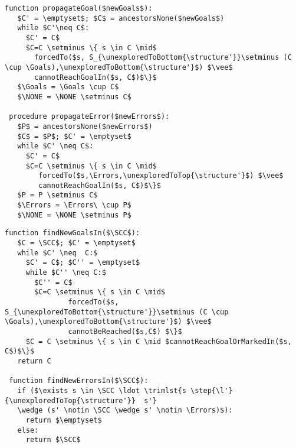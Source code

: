 \lstset{numbers=none, numberstyle=\tiny, stepnumber=1, numbersep=5pt}
\begin{lstlisting}[language={pseudocode},label={lst:dcs.propagate},caption={Status propagation procedures.},float=ht, frame=single]
 function propagateGoal($newGoals$):
   $C' = \emptyset$; $C$ = ancestorsNone($newGoals$)
   while $C'\neq C$:
     $C' = C$
     $C=C \setminus \{ s \in C \mid$ 
       forcedTo($s, S_{\unexploredToBottom{\structure'}}\setminus (C \cup \Goals),\unexploredToBottom{\structure'}$) $\vee$
       cannotReachGoalIn($s, C$)$\}$
   $\Goals = \Goals \cup C$
   $\NONE = \NONE \setminus C$

 procedure propagateError($newErrors$):
   $P$ = ancestorsNone($newErrors$)
   $C$ = $P$; $C' = \emptyset$
   while $C' \neq C$:
     $C' = C$
     $C=C \setminus \{ s \in C \mid$ 
     	forcedTo($s,\Errors,\unexploredToTop{\structure'}$) $\vee$
     	cannotReachGoalIn($s, C$)$\}$
   $P = P \setminus C$
   $\Errors = \Errors\ \cup P$
   $\NONE = \NONE \setminus P$
\end{lstlisting}


\begin{lstlisting}[language={pseudocode},label={lst:dcs.gather},caption={Status confirmation.},float=ht, frame=single]
 function findNewGoalsIn($\SCC$):
   $C = \SCC$; $C' = \emptyset$
   while $C' \neq  C:$
     $C' = C$; $C'' = \emptyset$
     while $C'' \neq C:$
       $C'' = C$
       $C=C \setminus \{ s \in C \mid$ 
               forcedTo($s, S_{\unexploredToBottom{\structure'}}\setminus (C \cup \Goals),\unexploredToBottom{\structure'}$) $\vee$
               cannotBeReached($s,C$) $\}$
     $C = C \setminus \{ s \in C \mid $cannotReachGoalOrMarkedIn($s, C$)$\}$
   return C
  
 function findNewErrorsIn($\SCC$):
   if ($\exists s \in \SCC \ldot \trimlst{s \step{\l'}{\unexploredToTop{\structure'}}  s'} 
   \wedge (s' \notin \SCC \wedge s' \notin \Errors)$):
     return $\emptyset$
   else: 
     return $\SCC$
\end{lstlisting}




